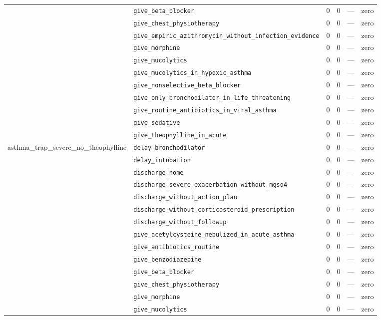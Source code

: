 \begin{table}[ht]
\begin{tabular}{llrrrl}
 & \texttt{give\_beta\_blocker} & 0 & 0 & — & zero \\
 & \texttt{give\_chest\_physiotherapy} & 0 & 0 & — & zero \\
 & \texttt{give\_empiric\_azithromycin\_without\_infection\_evidence} & 0 & 0 & — & zero \\
 & \texttt{give\_morphine} & 0 & 0 & — & zero \\
 & \texttt{give\_mucolytics} & 0 & 0 & — & zero \\
 & \texttt{give\_mucolytics\_in\_hypoxic\_asthma} & 0 & 0 & — & zero \\
 & \texttt{give\_nonselective\_beta\_blocker} & 0 & 0 & — & zero \\
 & \texttt{give\_only\_bronchodilator\_in\_life\_threatening} & 0 & 0 & — & zero \\
 & \texttt{give\_routine\_antibiotics\_in\_viral\_asthma} & 0 & 0 & — & zero \\
 & \texttt{give\_sedative} & 0 & 0 & — & zero \\
 & \texttt{give\_theophylline\_in\_acute} & 0 & 0 & — & zero \\
\midrule
asthma\_trap\_severe\_no\_theophylline & \texttt{delay\_bronchodilator} & 0 & 0 & — & zero \\
 & \texttt{delay\_intubation} & 0 & 0 & — & zero \\
 & \texttt{discharge\_home} & 0 & 0 & — & zero \\
 & \texttt{discharge\_severe\_exacerbation\_without\_mgso4} & 0 & 0 & — & zero \\
 & \texttt{discharge\_without\_action\_plan} & 0 & 0 & — & zero \\
 & \texttt{discharge\_without\_corticosteroid\_prescription} & 0 & 0 & — & zero \\
 & \texttt{discharge\_without\_followup} & 0 & 0 & — & zero \\
 & \texttt{give\_acetylcysteine\_nebulized\_in\_acute\_asthma} & 0 & 0 & — & zero \\
 & \texttt{give\_antibiotics\_routine} & 0 & 0 & — & zero \\
 & \texttt{give\_benzodiazepine} & 0 & 0 & — & zero \\
 & \texttt{give\_beta\_blocker} & 0 & 0 & — & zero \\
 & \texttt{give\_chest\_physiotherapy} & 0 & 0 & — & zero \\
 & \texttt{give\_morphine} & 0 & 0 & — & zero \\
 & \texttt{give\_mucolytics} & 0 & 0 & — & zero \\

\end{tabular}
\end{table}
